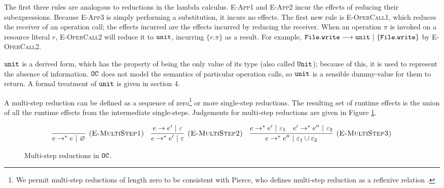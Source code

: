 The first three rules are analogous to reductions in the lambda calculus. \textsc{E-App1} and \textsc{E-App2} incur the effects of reducing their subexpressions. Because \textsc{E-App3} is simply performing a substitution, it incurs no effects. The first new rule is \textsc{E-OperCall1}, which reduces the receiver of an operation call; the effects incurred are the effects incurred by reducing the receiver. When an operation $\pi$ is invoked on a resource literal $r$, \textsc{E-OperCall2} will reduce it to $\mathtt{unit}$, incurring $\{ r.\pi \}$ as a result. For example, $\mathtt{File.write} \longrightarrow \mathtt{unit}~|~\{ \mathtt{File.write} \}$ by \textsc{E-OperCall2}.

$\mathtt{unit}$ is a derived form, which has the property of being the only value of its type (also called $\mathtt{Unit}$); because of this, it is used to represent the absence of information. $\mathtt{OC}$ does not model the semantics of particular operation calls, so $\mathtt{unit}$ is a sensible dummy-value for them to return. A formal treatment of $\mathtt{unit}$ is given in section 4.

A multi-step reduction can be defined as a sequence of zero\footnote{We permit multi-step reductions of length zero to be consistent with Pierce, who defines multi-step reduction as a reflexive relation \cite[p. 39]{pierce02}.} or more single-step reductions. The resulting set of runtime effects is the union of all the runtime effects from the intermediate single-steps. Judgements for multi-step reductions are given in Figure \ref{fig:opercalc_multistep_defn}.

\begin{figure}[h]

\noindent
{}

\[
\begin{array}{c}

\infer[\textsc{(E-MultiStep1)}]
	{ e \rightarrow^{*}  e~|~\varnothing}
	{}
~~~
\infer[\textsc{(E-MultiStep2)}]
	{ e \rightarrow^{*}  e'~|~\varepsilon}
	{ e \rightarrow  e'~|~\varepsilon}
~~~	
\infer[\textsc{(E-MultiStep3)}]
	{ e \rightarrow^{*}  e''~|~\varepsilon_1 \cup \varepsilon_2}
	{ e \rightarrow^{*}  e'~|~\varepsilon_1 &  e' \rightarrow^{*}  e''~|~\varepsilon_2}
\end{array}
\]

\vspace{-7pt}
\caption{Multi-step reductions in $\mathtt{OC}$.}
\label{fig:opercalc_multistep_defn}
\end{figure}

